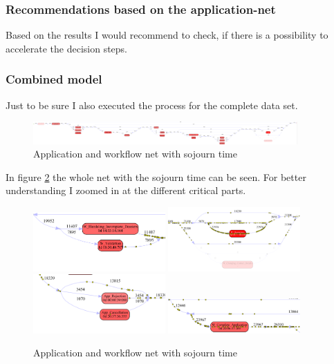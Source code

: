\subsubsection{Recommendations based on the application-net}

Based on the results I would recommend to check, if there is a possibility to accelerate the decision steps. 

\subsubsection{Combined model}

Just to be sure I also executed the process for the complete data set.

\begin{figure}[!htbp]
\centering
\includegraphics[width = 0.9\textwidth]{APP_Work_Bottle.PNG}
\caption{Application and workflow net with sojourn time}
\label{fig: AppWorkSojuComp}
\end{figure}

In figure \ref{fig: AppWorkSojuComp} the whole net with the sojourn time can be seen. For better understanding I zoomed in at the different critical parts.

\begin{figure}[!htbp]
\centering
\includegraphics[width = 0.45\textwidth]{APP_Work_BottleVal.PNG}
\includegraphics[width = 0.45\textwidth]{APP_Work_BottleQuot.PNG}
\includegraphics[width = 0.45\textwidth]{APP_Work_BottleCanc.PNG}
\includegraphics[width = 0.45\textwidth]{APP_Work_BottleCompl.PNG}
\caption{Application and workflow net with sojourn time}
\label{fig: AppWorkSojuComp}
\end{figure}


